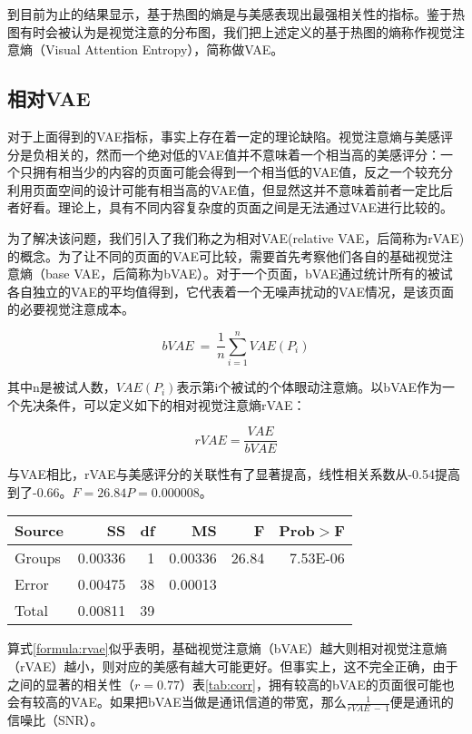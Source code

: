 到目前为止的结果显示，基于热图的熵是与美感表现出最强相关性的指标。鉴于热图有时会被认为是视觉注意的分布图，我们把上述定义的基于热图的熵称作视觉注意熵（Visual Attention Entropy），简称做VAE。

\subsection{相对VAE}
对于上面得到的VAE指标，事实上存在着一定的理论缺陷。视觉注意熵与美感评分是负相关的，然而一个绝对低的VAE值并不意味着一个相当高的美感评分：一个只拥有相当少的内容的页面可能会得到一个相当低的VAE值，反之一个较充分利用页面空间的设计可能有相当高的VAE值，但显然这并不意味着前者一定比后者好看。理论上，具有不同内容复杂度的页面之间是无法通过VAE进行比较的。

为了解决该问题，我们引入了我们称之为相对VAE(relative VAE，后简称为rVAE)的概念。为了让不同的页面的VAE可比较，需要首先考察他们各自的基础视觉注意熵（base VAE，后简称为bVAE）。对于一个页面，bVAE通过统计所有的被试各自独立的VAE的平均值得到，它代表着一个无噪声扰动的VAE情况，是该页面的必要视觉注意成本。

$$bVAE~=~\frac{1}{n}\sum_{i=1}^n VAE(P_i)$$

其中n是被试人数，$VAE(P_i)$表示第i个被试的个体眼动注意熵。以bVAE作为一个先决条件，可以定义如下的相对视觉注意熵rVAE：

\begin{equation}
rVAE = \frac{VAE}{bVAE}
\label{formula:rvae}
\end{equation}

与VAE相比，rVAE与美感评分的关联性有了显著提高，线性相关系数从-0.54提高到了-0.66。$F = 26.84 P = 0.000008$。

\begin{table}[H]
\centering
\begin{tabular}{lrrrrr}
  \hline
  Source&SS&df&MS&F&Prob$>$F\\ \hline
  Groups&0.00336&1&0.00336&26.84&7.53E-06\\
  Error&0.00475&38&0.00013&&\\
  Total&0.00811&39&&&\\
  \hline
\end{tabular}
\end{table}

算式\ref{formula:rvae}似乎表明，基础视觉注意熵（bVAE）越大则相对视觉注意熵（rVAE）越小，则对应的美感有越大可能更好。但事实上，这不完全正确，由于之间的显著的相关性（$r = 0.77$）表\ref{tab:corr}，拥有较高的bVAE的页面很可能也会有较高的VAE。如果把bVAE当做是通讯信道的带宽，那么$\frac{1}{{rVAE} ~-~ 1}$便是通讯的信噪比（SNR）。

